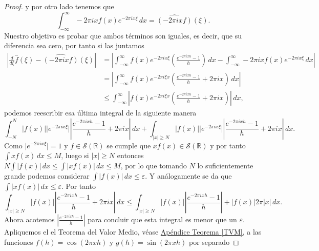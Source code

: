 \documentclass[12pt]{article}
\newcommand{\Sc}{\mathcal{S}(\mathbb{R})}
\theoremstyle{plain}
\theoremstyle{definition}
\numberwithin{equation}{section}
\begin{document}
\begin{proof}
                y por otro lado tenemos que
                $$ \int_{-\infty}^{\infty} -2\pi i x f(x) e^{-2\pi i x \xi} \, dx = \widehat{(-2\pi i x f)}(\xi) .$$ 
                Nuestro objetivo es probar que ambos términos son iguales, es decir, que su diferencia sea cero, por tanto si las juntamos
                \begin{align*}
                    \left\lvert \frac{d}{d\xi}\hat{f}(\xi) - \widehat{(-2\pi i x f)}(\xi) \right\rvert &= \left\lvert \int_{-\infty}^{\infty} f(x) e^{-2\pi i x \xi} \left( \frac{e^{-2\pi i x h} - 1}{h} \right) \, dx -   \int_{-\infty}^{\infty} -2\pi i x f(x) e^{-2\pi i x \xi} \, dx \right\rvert\\
                    &= \left\lvert \int_{-\infty}^{\infty}  f(x) e^{-2\pi i \xi x} \left( \frac{e^{-2\pi i x h} - 1}{h} + 2\pi i x \right)  \, dx\right\rvert\\
                    &\le \int_{-\infty}^{\infty} \left\lvert f(x) e^{-2\pi i \xi x} \left( \frac{e^{-2\pi i x h} - 1}{h} + 2\pi i x \right) \right\rvert \, dx,
                \end{align*}
                podemos reescribir esa última integral de la siguiente manera
                $$ \int_{-N}^{N} \lvert f(x) \rvert \lvert e^{-2\pi i x \xi} \rvert \left\lvert \frac{e^{-2\pi i x h} - 1}{h} + 2\pi i x \right\rvert \, dx + \int_{\lvert x \rvert \ge N} \lvert f(x) \rvert \lvert e^{-2\pi i x \xi} \rvert \left\lvert \frac{e^{-2\pi i x h} - 1}{h} + 2\pi i x \right\rvert \, dx.$$ 
                Como \(\lvert e^{-2\pi i x \xi} \rvert = 1\) y \(f \in \Sc\) se cumple que \(xf(x) \in \Sc\) y por tanto \(\int xf(x) \, dx \leq M\), luego si \(\left\lvert x\right\rvert \ge N\) entonces \(N\int \left\lvert f(x)\right\rvert  \, dx \le \int \left\lvert xf(x)\right\rvert \, dx \le M\), por lo que tomando \(N\) lo suficientemente grande podemos considerar \(\int \left\lvert f(x)\right\rvert\, dx \le \varepsilon\). Y análogamente se da que \(\int \left\lvert xf(x)\right\rvert \, dx \le \varepsilon\). Por tanto
                $$ \int_{\lvert x \rvert \ge N} \lvert f(x) \rvert \left\lvert \frac{e^{-2\pi i x h} - 1}{h} + 2\pi i x \right\rvert \, dx \le \int_{\lvert x \rvert \ge N} \lvert f(x) \rvert \left\lvert \frac{e^{-2\pi i x h} - 1}{h}\right\rvert + \left\lvert f(x)\right\rvert2\pi \left\lvert x\right\rvert  \, dx. $$ 
                Ahora acotemos \(\left\lvert \frac{e^{-2\pi i x h} - 1}{h}\right\rvert\) para concluir que esta integral es menor que un \(\varepsilon\).
                Apliquemos el el Teorema del Valor Medio, véase \hyperref[TVM]{Apéndice Teorema \ref*{TVM}}, a las funciones \(f(h) = \cos(2\pi xh)\) y \(g(h) = \sin (2\pi xh)\) por separado

\end{proof}
\end{document}
